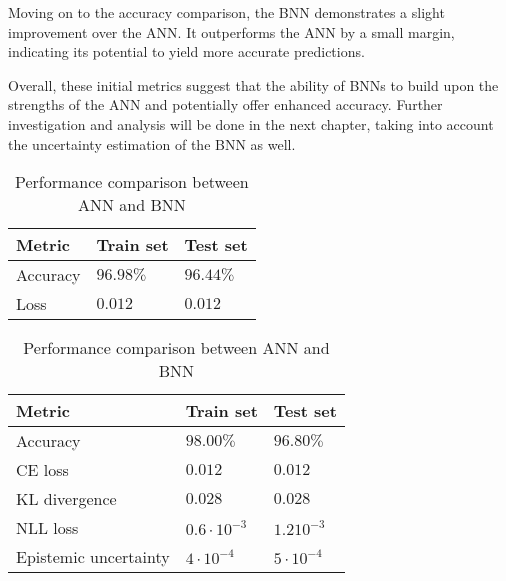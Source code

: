 Moving on to the accuracy comparison, the BNN demonstrates a slight improvement over the ANN. It outperforms the ANN by a small margin, indicating its potential to yield more accurate predictions.

Overall, these initial metrics suggest that the ability of BNNs to build upon the strengths of the ANN and potentially offer enhanced accuracy. Further investigation and analysis will be done in the next chapter, taking into account the uncertainty estimation of the BNN as well.

\begin{table}[h]
	\begin{subtable}[h]{0.5\textwidth}
		\centering
		\begin{tabular}{|| l | l | l ||} 
			\hline
			\textbf{Metric} & \textbf{Train set} & \textbf{Test set}\\
			\hline
			\hline
			Accuracy & $96.98\%$ & $96.44\%$\\	
			Loss & $0.012$ & $0.012$\\
			\hline
		\end{tabular}	
		\caption{Performance results of the ANN}
		\label{table:annper}
	\end{subtable}
	\hfill
	\begin{subtable}[h]{0.5\textwidth}
		\centering
		\begin{tabular}{|| l | l | l ||} 
			\hline
			\textbf{Metric} & \textbf{Train set} & \textbf{Test set}\\
			\hline
			\hline
			Accuracy & $98.00\%$ & $96.80\%$\\	
			CE loss & $0.012$ & $0.012$\\
			KL divergence & $0.028$ & $0.028$\\
			NLL loss & $0.6 \cdot 10^{-3}$ & $1.2 10^{-3}$\\
			Epistemic uncertainty & $4 \cdot 10^{-4}$ & $5 \cdot 10^{-4}$\\
			\hline
		\end{tabular}	
		\caption{Performance results of the BNN}
		\label{table:bnnper}
	\end{subtable}

	\caption{Performance comparison between ANN and BNN}
	\label{tab:percomp}
\end{table}